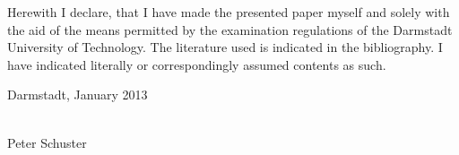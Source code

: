 \newpage

\thispagestyle{empty}
\cleardoublepage
\vspace*{9cm}

Herewith I declare, that I have made the presented paper myself and solely with the aid of the means permitted by the examination regulations of the Darmstadt University of Technology.
The literature used is indicated in the bibliography.
I have indicated literally or correspondingly assumed contents as such.

\vspace*{3cm}

Darmstadt, January 2013\\

\vspace*{5mm}


\parbox{7cm}{\hrulefill}\\
\hspace*{0,3cm} Peter Schuster

\cleardoublepage
\endinput
